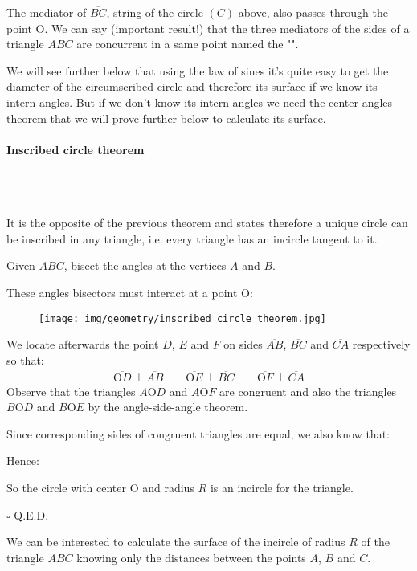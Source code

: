 	\begin{tcolorbox}[title=Remark,colframe=black,arc=10pt]
	The mediator of $\overline{BC}$, string of the circle $(C)$ above, also passes through the point O. We can say (important result!) that the three mediators of the sides of a triangle $ABC$ are concurrent in a same point named the "".
	\end{tcolorbox}
	We will see further below that using the law of sines it's quite easy to get the diameter of the circumscribed circle and therefore its surface if we know its intern-angles. But if we don't know its intern-angles we need the center angles theorem that we will prove further below to calculate its surface.

	\paragraph{Inscribed circle theorem}\mbox{}\\\\
	\begin{theorem}
	It is the opposite of the previous theorem and states therefore a unique circle can be inscribed in any triangle, i.e. every triangle has an incircle tangent to it.
	\end{theorem}
	\begin{dem}
	Given $ABC$, bisect the angles at the vertices $A$ and $B$.

	These angles bisectors must interact at a point O:
	\begin{figure}[H]
		\centering
		\texttt{[image: img/geometry/inscribed\_circle\_theorem.jpg]}
	\end{figure}

	We locate afterwards the point $D$, $E$ and $F$ on sides $\overline{AB}$, $\overline{BC}$ and $\overline{CA}$ respectively so that:
	\begin{gather*}
		\overline{\text{O}D}\perp \overline{AB} \qquad \overline{\text{O}E}\perp \overline{BC}  \qquad \overline{\text{O}F}\perp \overline{CA} 
	\end{gather*}
	Observe that the triangles $A\text{O}D$ and $A\text{O}F$ are congruent and also the triangles $B\text{O}D$ and $B\text{O}E$ by the angle-side-angle theorem.
	
	Since corresponding sides of congruent triangles are equal, we also know that:
	
	Hence:
	
	So the circle with center O and radius $R$ is an incircle for the triangle.
	\begin{flushright}
		$\square$  Q.E.D.
	\end{flushright}
	\end{dem}
	We can be interested to calculate the surface of the incircle of radius $R$ of the triangle $ABC$ knowing only the distances between the points $A$, $B$ and $C$.
	
